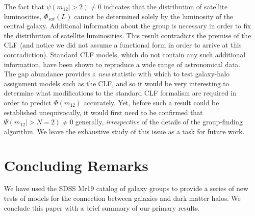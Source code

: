 \documentclass[usenatbib,usegraphicx,letterpaper]{mn2e}
\newcommand{\monetwo}{m_{12}}
\begin{document}
The fact that $\psi(\monetwo | >2) \neq 0$ indicates that 
the distribution of satellite luminosities, 
$\Phi_{sat}(L)$ cannot be determined solely by 
the luminosity of the central galaxy. Additional 
information about the group is necessary in order to 
fix the distribution of satellite luminosities.  This result 
contradicts the premise of the CLF (and notice we 
did not assume a functional form in order to arrive 
at this contradiction). Standard CLF models, which do 
not contain any such additional information, have been shown to reproduce 
a wide range of astronomical data.  The gap abundance provides a {\em new} 
statistic with which to test galaxy-halo assignment models such as the CLF, 
and so it would be very interesting to determine what modifications 
to the standard CLF formalism are required
in order to predict $\Phi(\monetwo)$ accurately. 
Yet, before such a result could be established unequivocally, 
it would first need to be confirmed that
$\Psi(\monetwo|>N=2) \neq 0$ generally, {\em irrespective} of the 
details of the group-finding algorithm. We leave the exhaustive 
study of this issue as a task for future work. 


\section{Concluding Remarks}
\label{section:conclusion}

We have used the SDSS Mr19 catalog of galaxy groups to provide a
series of new tests of models for the connection between galaxies and
dark matter halos. We conclude this paper with a brief summary of our
primary results.
\end{document}
